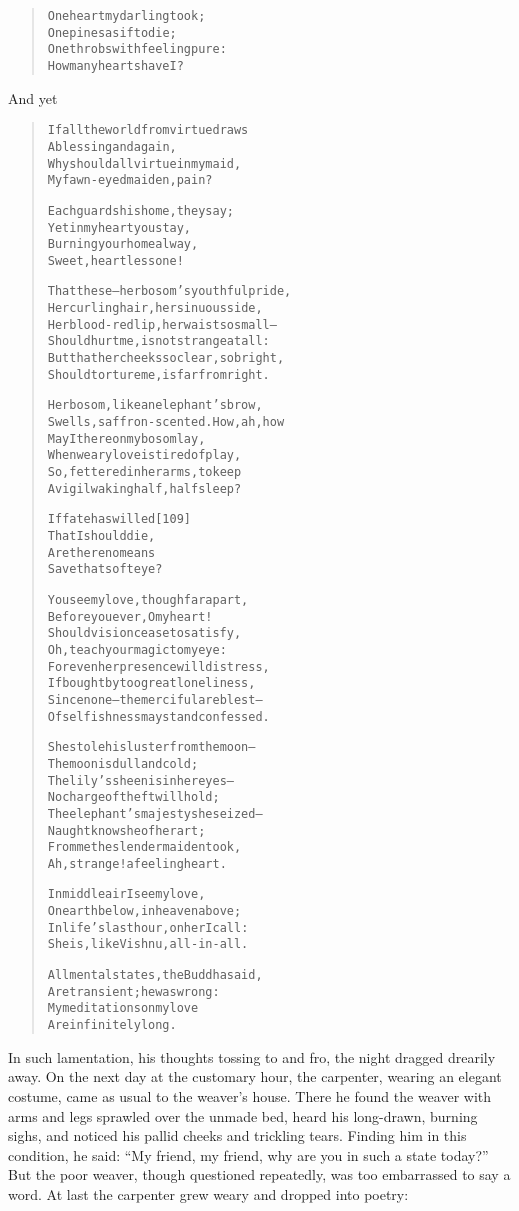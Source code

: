\documentclass[article, twoside, 14pt]{memoir}
\renewenvironment{verbatim}{%
\begin{quote}%
\vskip -10pt%
\begin{alltt}\normalfont\large}{\end{alltt}%
\end{quote}%
\vskip -10pt
} %
\begin{document}
\begin{verbatim}
One heart my darling took;
    One pines as if to die;
One throbs with feeling pure:
    How many hearts have I?
\end{verbatim}
And yet

\begin{verbatim}
If all the world from virtue draws
    A blessing and a gain,
Why should all virtue in my maid,
    My fawn-eyed maiden, pain?

Each guards his home, they say;
Yet in my heart you stay,
Burning your home alway,
Sweet, heartless one!

That these--her bosom's youthful pride,
Her curling hair, her sinuous side,
Her blood-red lip, her waist so small--
Should hurt me, is not strange at all:
But that her cheeks so clear, so bright,
Should torture me, is far from right.

Her bosom, like an elephant's brow,
Swells, saffron-scented. How, ah, how
May I thereon my bosom lay,
When weary love is tired of play,
So, fettered in her arms, to keep
A vigil waking half, half sleep?

If fate has willed                                      [109]
    That I should die,
Are there no means
    Save that soft eye?

You see my love, though far apart,
Before you ever, O my heart!
Should vision cease to satisfy,
Oh, teach your magic to my eye:
For even her presence will distress,
If bought by too great loneliness,
Since none--the merciful are blest--
Of selfishness may stand confessed.

She stole his luster from the moon--
    The moon is dull and cold;
The lily's sheen is in her eyes--
    No charge of theft will hold;
The elephant's majesty she seized--
    Naught knows he of her art;
From me the slender maiden took,
    Ah, strange! a feeling heart.

In middle air I see my love,
On earth below, in heaven above;
In life's last hour, on her I call:
She is, like Vishnu, all-in-all.

All mental states, the Buddha said,
    Are transient; he was wrong:
My meditations on my love
    Are infinitely long.
\end{verbatim}
In such lamentation, his thoughts tossing to and fro, the night
dragged drearily away. On the next day at the customary hour, the
carpenter, wearing an elegant costume, came as usual to the
weaver's house. There he found the weaver with arms and legs
sprawled over the unmade bed, heard his long-drawn, burning sighs,
and noticed his pallid cheeks and trickling tears. Finding him in
this condition, he said:
``My friend, my friend, why are you in such a state today?'' But
the poor weaver, though questioned repeatedly, was too embarrassed
to say a word. At last the carpenter grew weary and dropped into
poetry:
\end{document}
